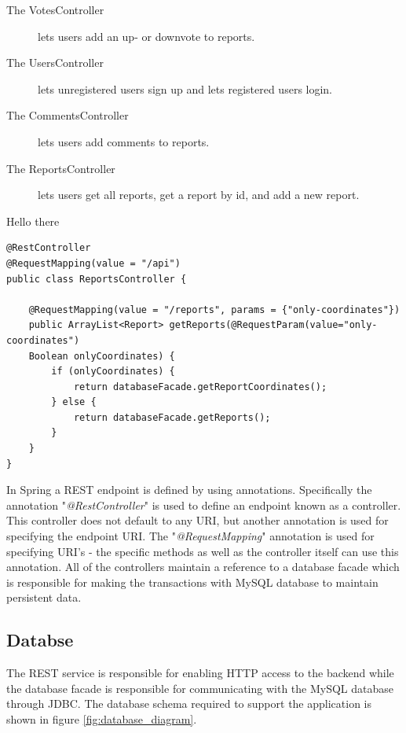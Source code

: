 \begin{description}
\item [The VotesController] lets users add an up- or downvote to reports.
\item [The UsersController] lets unregistered users sign up and lets registered users login.
\item [The CommentsController] lets users add comments to reports.
\item [The ReportsController] lets users get all reports, get a report by id, and add a new report.
\end{description}

\begin{listing}[H]
\caption{Hello there}\label{lst:restController}
\begin{verbatim}
@RestController
@RequestMapping(value = "/api")
public class ReportsController {

    @RequestMapping(value = "/reports", params = {"only-coordinates"})
    public ArrayList<Report> getReports(@RequestParam(value="only-coordinates")
    Boolean onlyCoordinates) {
        if (onlyCoordinates) {
            return databaseFacade.getReportCoordinates();
        } else {
            return databaseFacade.getReports();
        }
    }
}
\end{verbatim}
\end{listing}

In Spring a REST endpoint is defined by using annotations. Specifically the annotation "\textit{@RestController}" is used to define an endpoint known as a  controller. This controller does not default to any URI, but another annotation is used for specifying the endpoint URI. The "\textit{@RequestMapping}" annotation is used for specifying URI's - the specific methods as well as the controller itself can use this annotation. All of the controllers maintain a reference to a database facade which is responsible for making the transactions with MySQL database to maintain persistent data.

\subsection{Databse}
The REST service is responsible for enabling HTTP access to the backend while the database facade is responsible for communicating with the MySQL database through JDBC. The database schema required to support the application is shown in figure \ref{fig:database_diagram}.

